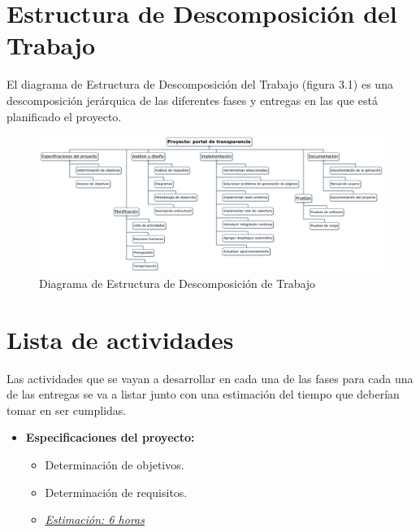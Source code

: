 \section{Estructura de Descomposición del Trabajo}

El diagrama de Estructura de Descomposición del Trabajo (figura 3.1) es una descomposición jerárquica de las diferentes fases y 
entregas en las que está planificado el proyecto.

\newpage
\begin{landscape} 
  \begin{figure}[!h]
    \begin{center}
    \includegraphics[scale=0.3]{imagenes/diagrama_edt.png}
    \caption[EDT]{Diagrama de Estructura de Descomposición de Trabajo}
    \label{fig:edt}
    \end{center}
  \end{figure} 
\end{landscape}

\newpage
\section{Lista de actividades}

Las actividades que se vayan a desarrollar en cada una de las fases para cada una de las entregas se va a listar junto con una 
estimación del tiempo que deberían tomar en ser cumplidas.

\begin{itemize}
   \item \textbf{Especificaciones del proyecto:}
   \begin{itemize}
    \item Determinación de objetivos.
    \item Determinación de requisitos.
    \item \underline{\textit{Estimación: 6 horas}}
    \end{itemize}
\end{itemize}

